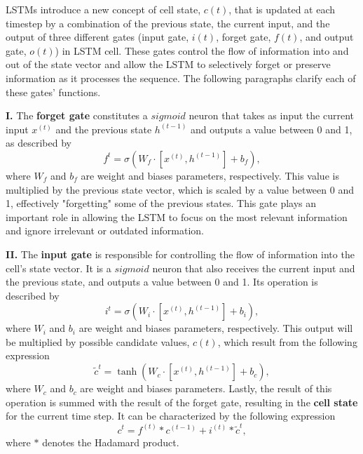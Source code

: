 LSTMs introduce a new concept of cell state, $c(t)$, that is updated at each timestep by a combination of the previous state, the current input, and the output of three different gates (input gate, $i(t)$, forget gate, $f(t)$, and output gate, $o(t)$) in LSTM cell. These gates control the flow of information into and out of the state vector and allow the LSTM to selectively forget or preserve information as it processes the sequence. 
The following paragraphs clarify each of these gates' functions.
\begin{description}

    \item{\textbf{I.}}
    The \textbf{forget gate} constitutes a $sigmoid$ neuron that takes as input the current input $x^{(t)}$ and the previous state $h^{(t-1)}$ and outputs a value between 0 and 1, as described by
        \begin{equation}
            \label{eq:forgetGate}
             f^t =\sigma( W_f \cdot [x^{(t)} , h^{(t-1)}] + b_f ),
        \end{equation}
   where $W_f$ and $b_f$ are weight and biases parameters, respectively. This value is multiplied by the previous state vector, which is scaled by a value between 0 and 1, effectively "forgetting" some of the previous states. This gate plays an important role in allowing the LSTM to focus on the most relevant information and ignore irrelevant or outdated information.

    \item{\textbf{II.}}  
    The \textbf{input gate} is responsible for controlling the flow of information into the cell's state vector. It is a $sigmoid$ neuron that also receives the current input and the previous state, and outputs a value between 0 and 1. Its operation is described by
    \begin{equation}
        \label{eq:inputGate}
        i^t=\sigma( W_i \cdot [x^{(t)} , h^{(t-1)}] + b_i ),
    \end{equation}
    where $W_i$ and $b_i$ are weight and biases parameters, respectively. 
    This output will be multiplied by possible candidate values, $c(t)$, which result from the following expression
    \begin{equation}
        \label{eq:cellState candidate}
         \tilde c^t=\tanh( W_c \cdot [x^{(t)} , h^{(t-1)}] + b_c),
    \end{equation} 
    where $W_c$ and $b_c$ are weight and biases parameters. 
    Lastly, the result of this operation is summed with the result of the forget gate, resulting in the \textbf{cell state} for the current time step. It can be characterized by the following expression
    \begin{equation}
        \label{eq:cellState}
         c^t= f^{(t)} * c^{(t-1)} + i^{(t)} *  \tilde c^t,
    \end{equation} 
    where $*$ denotes the Hadamard product.
    

\end{description}
